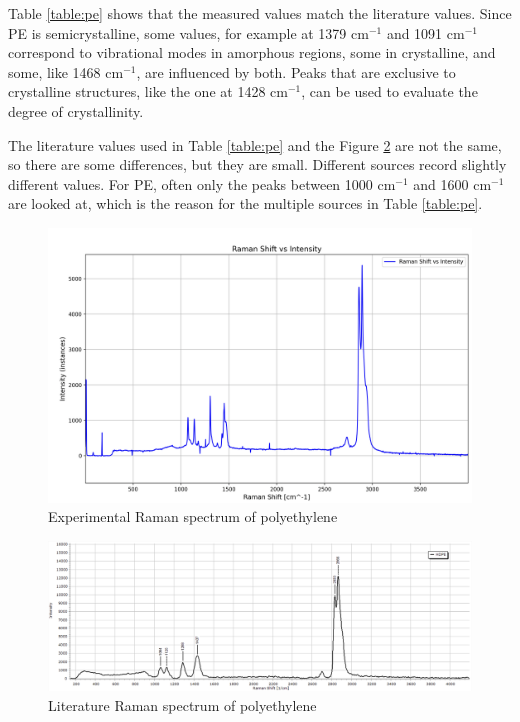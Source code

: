     Table \ref{table:pe} shows that the measured values match the literature values. Since PE is semicrystalline, some values, for example at 1379 cm\(^{-1}\) and 1091 cm\(^{-1}\) correspond to vibrational modes in amorphous regions, some in crystalline, and some, like 1468 cm\(^{-1}\), are influenced by both. Peaks that are exclusive to crystalline structures, like the one at 1428 cm\(^{-1}\), can be used to evaluate the degree of crystallinity.

    \bigskip
    
    The literature values used in Table \ref{table:pe} and the Figure \ref{fig:pe_l} are not the same, so there are some differences, but they are small. Different sources record slightly different values. For PE, often only the peaks between 1000 cm\(^{-1}\) and 1600 cm\(^{-1}\) are looked at, which is the reason for the multiple sources in Table \ref{table:pe}.

    

    \newpage

    \begin{figure}[h]
        \centering
        \includegraphics[width=\textwidth]{images/raman_spectra/raman_shift_polyethyleneh.png}
        \caption{Experimental Raman spectrum of polyethylene}
        \label{fig:pe_x}
    \end{figure}

    \begin{figure}[h]
        \centering
        \includegraphics[width=\textwidth]{images/lit_raman/HDPE.png}
        \caption{Literature Raman spectrum of polyethylene \cite{spectrap}}
        \label{fig:pe_l}
    \end{figure}

